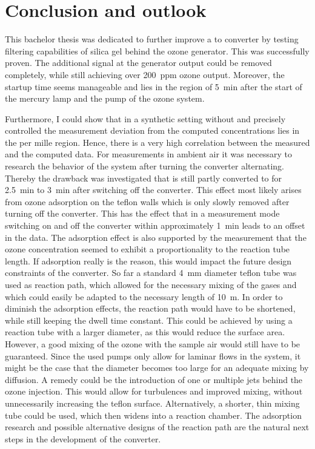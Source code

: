 \section{Conclusion and outlook}
\label{sec:conclusion}

This bachelor thesis was dedicated to further improve a  to
 converter by testing  filtering capabilities of silica gel
behind the ozone generator. This was successfully proven. The
additional  signal at the generator output could be removed
completely, while still achieving over \SI{200}{ppm} ozone
output. Moreover, the startup time seems manageable and lies in the
region of \SI{5}{\minute} after the start of the mercury lamp and the
pump of the ozone system. 

Furthermore, I could show that in a synthetic setting without 
and precisely controlled  the measurement deviation from the
computed  concentrations lies in the per mille region. Hence,
there is a very high correlation between the measured and the computed
data. For measurements in ambient air it was necessary to research the
behavior of the system after turning the converter alternating.
Thereby the drawback was investigated that  is still partly
converted to  for \SI{2.5}{\minute} to \SI{3}{\minute} after
switching off the converter. This effect most likely arises from ozone
adsorption on the teflon walls which is only slowly removed after
turning off the converter. This has the effect that in a measurement
mode switching on and off the converter within approximately
\SI{1}{\minute} leads to an offset in the  data.  The
adsorption effect is also supported by the measurement that the ozone
concentration seemed to exhibit a proportionality to the reaction tube
length. If adsorption really is the reason, this would impact the
future design constraints of the converter. So far a standard
\SI{4}{\milli\meter} diameter teflon tube was used as reaction path,
which allowed for the necessary mixing of the gases and which could
easily be adapted to the necessary length of \SI{10}{\meter}. In order
to diminish the adsorption effects, the reaction path would have to be
shortened, while still keeping the dwell time constant. This could be
achieved by using a reaction tube with a larger diameter, as this
would reduce the surface area. However, a good mixing of the ozone
with the sample air would still have to be guaranteed. Since the used
pumps only allow for laminar flows in the system, it might be the case
that the diameter becomes too large for an adequate mixing by
diffusion. A remedy could be the introduction of one or multiple jets
behind the ozone injection. This would allow for turbulences and
improved mixing, without unnecessarily increasing the teflon
surface. Alternatively, a shorter, thin mixing tube could be used,
which then widens into a reaction chamber. The adsorption research and
possible alternative designs of the reaction path are the natural next
steps in the development of the converter.

